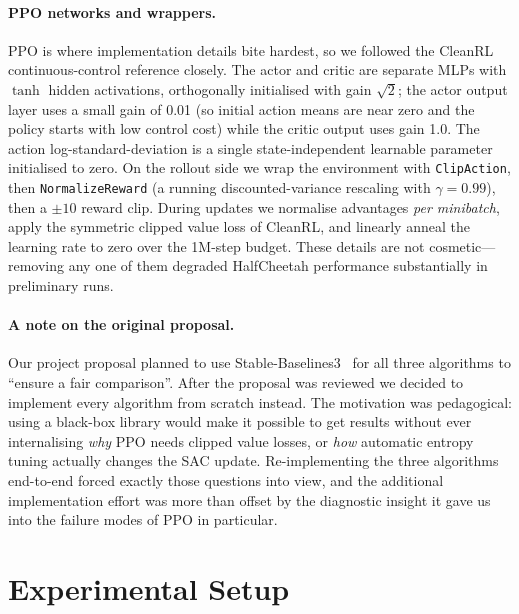 \documentclass[letterpaper]{article}
\begin{document}
\paragraph{PPO networks and wrappers.}
PPO is where implementation details bite hardest, so we followed the
CleanRL~\citep{huang2022cleanrl} continuous-control reference closely.
The actor and critic are separate MLPs with $\tanh$ hidden activations,
orthogonally initialised with gain $\sqrt{2}$; the actor output layer
uses a small gain of 0.01 (so initial action means are near zero and the
policy starts with low control cost) while the critic output uses gain
1.0. The action log-standard-deviation is a single state-independent
learnable parameter initialised to zero. On the rollout side we wrap the
environment with \texttt{ClipAction}, then \texttt{NormalizeReward} (a
running discounted-variance rescaling with $\gamma = 0.99$), then a
$\pm 10$ reward clip. During updates we normalise advantages
\emph{per minibatch}, apply the symmetric clipped value loss of CleanRL,
and linearly anneal the learning rate to zero over the 1M-step budget.
These details are not cosmetic---removing any one of them degraded
HalfCheetah performance substantially in preliminary runs.

\paragraph{A note on the original proposal.}
Our project proposal planned to use
Stable-Baselines3~\citep{raffin2021sb3} for all three algorithms to
``ensure a fair comparison''. After the proposal was reviewed we decided to
implement every algorithm from scratch instead. The motivation was
pedagogical: using a black-box library would make it possible to get
results without ever internalising \emph{why} PPO needs clipped value
losses, or \emph{how} automatic entropy tuning actually changes the SAC
update. Re-implementing the three algorithms end-to-end forced exactly
those questions into view, and the additional implementation effort was
more than offset by the diagnostic insight it gave us into the failure
modes of PPO in particular.

\section{Experimental Setup}
\end{document}
